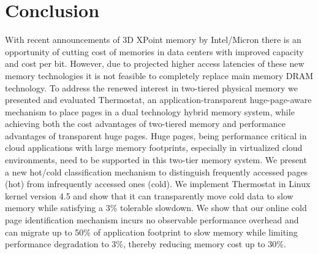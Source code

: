 \section{Conclusion}
\label{conclusion}
With recent announcements of 3D XPoint memory by Intel/Micron there is an
opportunity of cutting cost of memories in data centers with improved capacity
and cost per bit. However, due to projected higher access latencies of these new
memory technologies it is not feasible to completely replace main memory DRAM
technology. To address the renewed interest in two-tiered physical memory we
presented and evaluated Thermostat, an application-transparent huge-page-aware
mechanism to place pages in a dual technology hybrid memory system, while
achieving both the cost advantages of two-tiered memory and performance
advantages of transparent huge pages. Huge pages, being performance critical in
cloud applications with large memory footprints, especially in virtualized cloud
environments, need to be supported in this two-tier memory system. We present a
new hot/cold classification mechanism to distinguish frequently accessed pages
(hot) from infrequently accessed ones (cold).  We implement Thermostat in
Linux kernel version 4.5 and show that it can transparently move cold data to slow memory
while satisfying a 3\% tolerable slowdown. We show that our online
cold page identification mechanism incurs no observable performance overhead and
can migrate up to 50\% of application footprint to slow memory while limiting
performance degradation to 3\%, thereby reducing memory cost up to 30\%.
%
%
%
